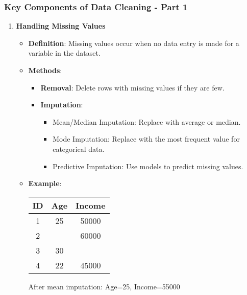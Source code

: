 \documentclass[aspectratio=169]{beamer}
\begin{document}
\begin{frame}[fragile]
    \frametitle{Key Components of Data Cleaning - Part 1}
    \begin{enumerate}
        \item \textbf{Handling Missing Values}
        \begin{itemize}
            \item \textbf{Definition}: Missing values occur when no data entry is made for a variable in the dataset.
            \item \textbf{Methods}:
            \begin{itemize}
                \item \textbf{Removal}: Delete rows with missing values if they are few.
                \item \textbf{Imputation}:
                \begin{itemize}
                    \item Mean/Median Imputation: Replace with average or median.
                    \item Mode Imputation: Replace with the most frequent value for categorical data.
                    \item Predictive Imputation: Use models to predict missing values.
                \end{itemize}
            \end{itemize}
            \item \textbf{Example}:
                \begin{center}
                \begin{tabular}{|c|c|c|}
                    \hline
                    ID & Age & Income \\
                    \hline
                    1  & 25  & 50000 \\
                    2  &     & 60000 \\
                    3  & 30  &     \\
                    4  & 22  & 45000 \\
                    \hline
                \end{tabular}
                \end{center}
                After mean imputation: Age=25, Income=55000
        \end{itemize}
    \end{enumerate}
\end{frame}
\end{document}
